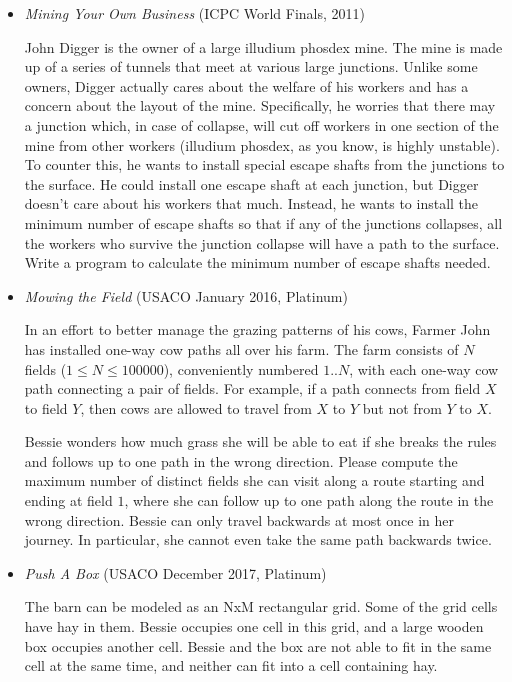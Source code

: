 \documentclass{article}
\begin{document}
\begin{itemize}[leftmargin=0pt]
\item[\label={}]
\textit{Mining Your Own Business} (ICPC World Finals, 2011)

John Digger is the owner of a large illudium phosdex mine. The mine is made up of a series of tunnels
that meet at various large junctions. Unlike some owners, Digger actually cares about the welfare of
his workers and has a concern about the layout of the mine. Specifically, he worries that there may a
junction which, in case of collapse, will cut off workers in one section of the mine from other workers
(illudium phosdex, as you know, is highly unstable). To counter this, he wants to install special escape
shafts from the junctions to the surface. He could install one escape shaft at each junction, but Digger
doesn’t care about his workers that much. Instead, he wants to install the minimum number of escape
shafts so that if any of the junctions collapses, all the workers who survive the junction collapse will
have a path to the surface.
Write a program to calculate the minimum number of escape shafts needed.

\item[\label={}]
\textit{Mowing the Field} (USACO January 2016, Platinum)

In an effort to better manage the grazing patterns of his cows, Farmer
John has installed one-way cow paths all over his farm. The farm
consists of $N$ fields ($1 \le N \le 100000$), conveniently numbered $1..N$, with each one-way
cow path connecting a pair of fields. For example, if a path connects
from field $X$ to field $Y$, then cows are allowed to travel from $X$ to $Y$
but not from $Y$ to $X$.

Bessie wonders how much grass she will be able to eat if she
breaks the rules and follows up to one path in the wrong direction.
Please compute the maximum number of distinct fields she can visit
along a route starting and ending at field $1$, where she can follow up
to one path along the route in the wrong direction. Bessie can only
travel backwards at most once in her journey. In particular, she
cannot even take the same path backwards twice.

\item[\label={}]
\textit{Push A Box} (USACO December 2017, Platinum)

The barn can be modeled as an NxM rectangular grid. Some of the grid cells have hay in them. Bessie occupies one cell in this grid, and a large wooden box occupies another cell. Bessie and the box are not able to fit in the same cell at the same time, and neither can fit into a cell containing hay.


\end{itemize}
\end{document}
